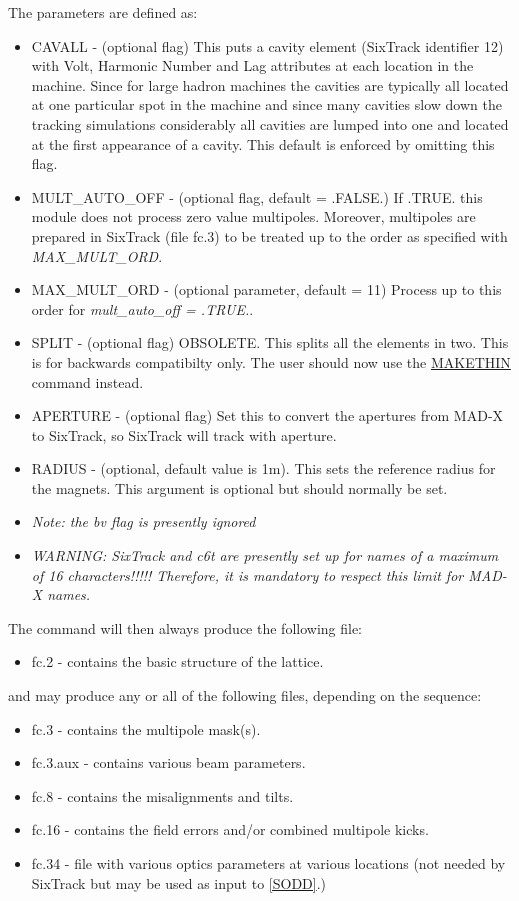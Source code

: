 The parameters are defined as: 
\begin{itemize}
   \item  CAVALL - (optional flag) This puts a cavity element (SixTrack
     identifier 12) with Volt, Harmonic Number and Lag attributes at
     each location in the machine. Since for large hadron machines the
     cavities are typically all located at one particular spot in the
     machine and since many cavities slow down the tracking simulations
     considerably all cavities are lumped into one and located at the
     first appearance of a cavity. This default is enforced by omitting
     this flag.  
   \item  MULT\_AUTO\_OFF - (optional flag, default = .FALSE.) If
     .TRUE. this module does not process zero value
     multipoles. Moreover, multipoles are prepared in SixTrack (file
     fc.3) to be treated up to the order as specified with
     \textit{MAX\_MULT\_ORD}.  
   \item  MAX\_MULT\_ORD - (optional parameter, default = 11) Process up
     to this order for \textit{ mult\_auto\_off = .TRUE.}.  
   \item  SPLIT  - (optional flag) OBSOLETE. This splits all the
     elements in  two. This is for backwards compatibilty only. The user
     should now use the  \href{../makethin/makethin.html}{MAKETHIN}
     command instead.  
   \item  APERTURE - (optional flag) Set this to convert the apertures
     from MAD-X to SixTrack, so SixTrack will track with aperture.  
   \item  RADIUS - (optional, default value is 1m). This sets the
     reference  radius for the magnets. This argument is optional but
     should normally  be set.  
   \item \textit{ Note: the bv flag is presently ignored} 
   \item \textit{ WARNING: SixTrack and c6t are presently set up for
     names of a maximum of 16 characters!!!!! Therefore, it is mandatory
     to respect this limit for MAD-X names.} 
\end{itemize}  

The command will then always produce the following file: 
\begin{itemize}
   \item  fc.2 - contains the basic structure of the lattice. 
\end{itemize} 
and may produce any or all of the following files, depending on  the sequence: 
\begin{itemize}
   \item  fc.3 - contains the multipole mask(s). 
   \item  fc.3.aux - contains various beam parameters. 
   \item  fc.8 - contains the misalignments and tilts. 
   \item  fc.16 - contains the field errors and/or combined multipole kicks. 
   \item  fc.34 - file with various optics parameters at various
     locations (not needed by SixTrack but may be used as input to
     \href{../Introduction/bibliography.html#SODD}{[SODD]}.)  
\end{itemize}  


